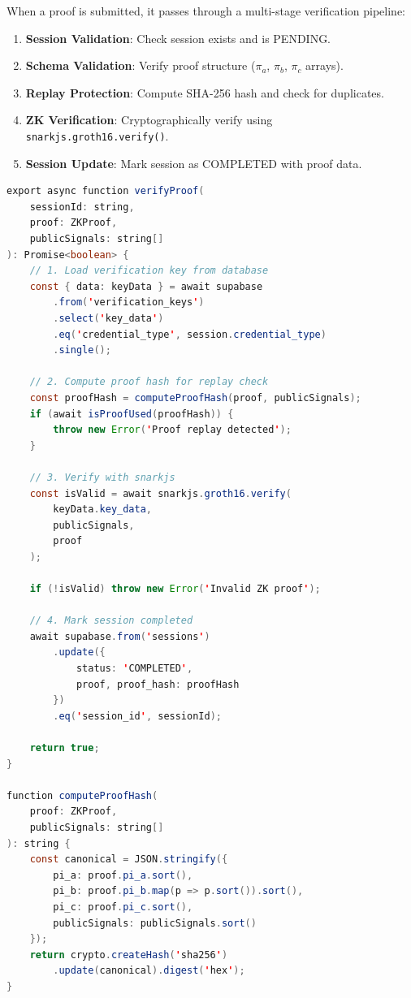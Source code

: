 When a proof is submitted, it passes through a multi-stage verification pipeline:

\begin{enumerate}
    \item \textbf{Session Validation}: Check session exists and is PENDING.
    \item \textbf{Schema Validation}: Verify proof structure ($\pi_a$, $\pi_b$, $\pi_c$ arrays).
    \item \textbf{Replay Protection}: Compute SHA-256 hash and check for duplicates.
    \item \textbf{ZK Verification}: Cryptographically verify using \texttt{snarkjs.groth16.verify()}.
    \item \textbf{Session Update}: Mark session as COMPLETED with proof data.
\end{enumerate}

\begin{lstlisting}[language=Java, caption={Proof Verification (zkVerifier.ts)}]
export async function verifyProof(
    sessionId: string,
    proof: ZKProof,
    publicSignals: string[]
): Promise<boolean> {
    // 1. Load verification key from database
    const { data: keyData } = await supabase
        .from('verification_keys')
        .select('key_data')
        .eq('credential_type', session.credential_type)
        .single();
    
    // 2. Compute proof hash for replay check
    const proofHash = computeProofHash(proof, publicSignals);
    if (await isProofUsed(proofHash)) {
        throw new Error('Proof replay detected');
    }
    
    // 3. Verify with snarkjs
    const isValid = await snarkjs.groth16.verify(
        keyData.key_data,
        publicSignals,
        proof
    );
    
    if (!isValid) throw new Error('Invalid ZK proof');
    
    // 4. Mark session completed
    await supabase.from('sessions')
        .update({ 
            status: 'COMPLETED', 
            proof, proof_hash: proofHash 
        })
        .eq('session_id', sessionId);
    
    return true;
}

function computeProofHash(
    proof: ZKProof, 
    publicSignals: string[]
): string {
    const canonical = JSON.stringify({
        pi_a: proof.pi_a.sort(),
        pi_b: proof.pi_b.map(p => p.sort()).sort(),
        pi_c: proof.pi_c.sort(),
        publicSignals: publicSignals.sort()
    });
    return crypto.createHash('sha256')
        .update(canonical).digest('hex');
}
\end{lstlisting}

